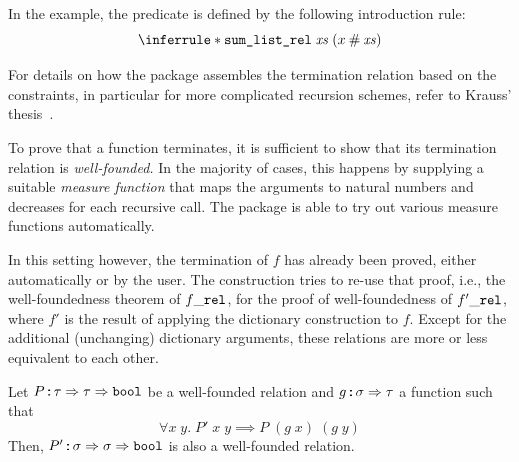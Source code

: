 In the example, the predicate  is defined by the following introduction rule:
\[
  \inferrule*{ }{
    \holconst{sum\_list\_rel}\;\mathit{xs}\;(x \cons \mathit{xs})
  }
\]

\noindent
For details on how the  package assembles the termination relation based on the constraints, in particular for more complicated recursion schemes, refer to Krauss' thesis~\cite{krauss2009fun}.

To prove that a function terminates, it is sufficient to show that its termination relation is \emph{well-founded.}
In the majority of cases, this happens by supplying a suitable \emph{measure function} that maps the arguments to natural numbers and decreases for each recursive call.
The  package is able to try out various measure functions automatically.

In this setting however, the termination of $f$ has already been proved, either automatically or by the user.
The construction tries to re-use that proof, i.e., the well-foundedness theorem of $f\_\texttt{\textup{rel}}$, for the proof of well-foundedness of $f'\_\texttt{\textup{rel}}$, where $f'$ is the result of applying the dictionary construction to $f$.
Except for the additional (unchanging) dictionary arguments, these relations are more or less equivalent to each other.

\begin{lemma}
  Let $P \mathbin{:\!\!:} \tau \Rightarrow \tau \Rightarrow \texttt{\textup{bool}}$ be a well-founded relation and $g \mathbin{:\!\!:} \sigma \Rightarrow \tau$ a function such that
  \[
    \forall x\; y.\; P'\;x\;y \implies P\;(g\;x)\;(g\;y)
  \]
  Then, $P' \mathbin{:\!\!:} \sigma \Rightarrow \sigma \Rightarrow \texttt{\textup{bool}}$ is also a well-founded relation.
\end{lemma}

